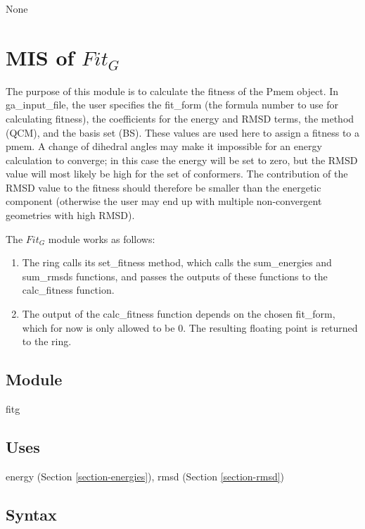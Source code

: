 \documentclass[12pt, titlepage]{article}
\begin{document}
None

\section{MIS of $Fit_G$} \label{section-fitg}

The purpose of this module is to calculate the fitness of the Pmem object. In 
ga\_input\_file, the user specifies the fit\_form (the formula number to use 
for calculating fitness), the coefficients for the energy and RMSD terms, the 
method (QCM), and the basis set (BS). These values are used here to assign a 
fitness to a pmem. A change of dihedral angles may make it impossible for an 
energy calculation to converge; in this case the energy will be set to zero, 
but the RMSD value will most likely be high for the set of conformers. The 
contribution of the RMSD value to the fitness should therefore be smaller than 
the energetic component (otherwise the user may end up with multiple 
non-convergent geometries with high RMSD).

The $Fit_G$ module works as follows:
\begin{enumerate}
	\item The ring calls its set\_fitness method, which calls the sum\_energies 
	and sum\_rmsds functions, and passes the outputs of these functions to the 
	calc\_fitness function.
	\item The output of the calc\_fitness function depends on the chosen 
	fit\_form, which for now is only allowed to be 0. The resulting floating 
	point is returned to the ring.
\end{enumerate}

\subsection{Module}

fitg

\subsection{Uses}

energy (Section \ref{section-energies}), rmsd (Section \ref{section-rmsd})

\subsection{Syntax}
\end{document}

